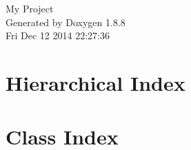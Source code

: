 \documentclass[twoside]{book}
\newcommand{\+}{\discretionary{\mbox{\scriptsize$\hookleftarrow$}}{}{}}
\newcommand{\clearemptydoublepage}{%
  \newpage{\pagestyle{empty}\cleardoublepage}%
}
\begin{document}
\hypersetup{pageanchor=false,
             bookmarks=true,
             bookmarksnumbered=true,
             pdfencoding=unicode
            }
\begin{titlepage}
\vspace*{7cm}
\begin{center}%
{\Large My Project }\\
\vspace*{1cm}
{\large Generated by Doxygen 1.8.8}\\
\vspace*{0.5cm}
{\small Fri Dec 12 2014 22:27:36}\\
\end{center}
\end{titlepage}
\clearemptydoublepage
\tableofcontents
\clearemptydoublepage
{}
\hypersetup{pageanchor=true}

\chapter{Hierarchical Index}

\chapter{Class Index}

\end{document}
